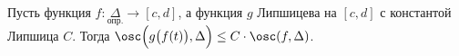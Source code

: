 
 	Пусть функция $f\colon\underset{\text{опр.}}{\Delta}\to[c,d]$, а функция $g$ Липшицева на $[c,d]$ с константой Липшица $C$. Тогда $\osc\Big(g\big(f(t)\big),\Delta\Big)\leq
 	C\cdot\osc(f,\Delta)$.
 
